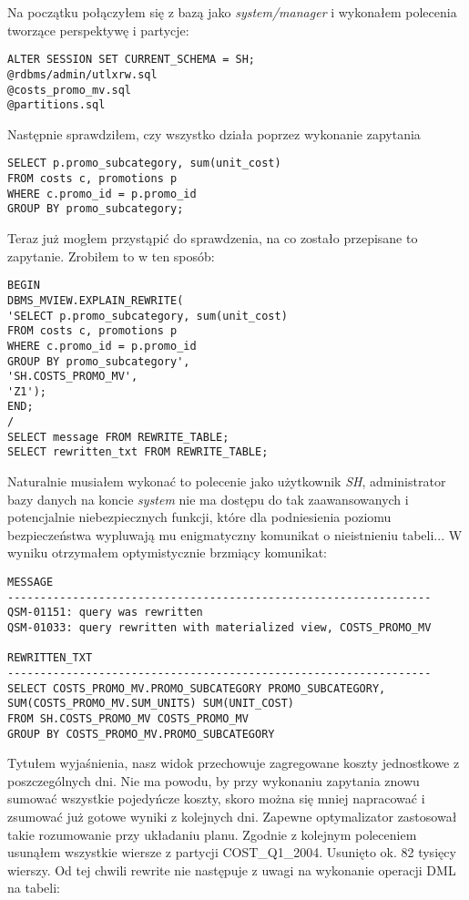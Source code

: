 \documentclass[a4paper,11pt]{article}
\begin{document}
Na początku połączyłem się z bazą jako \textit{system/manager} i wykonałem polecenia tworzące
perspektywę i partycje:
\begin{verbatim}
ALTER SESSION SET CURRENT_SCHEMA = SH;
@rdbms/admin/utlxrw.sql
@costs_promo_mv.sql
@partitions.sql
\end{verbatim}
Następnie sprawdziłem, czy wszystko działa poprzez wykonanie zapytania
\begin{verbatim}
SELECT p.promo_subcategory, sum(unit_cost)
FROM costs c, promotions p
WHERE c.promo_id = p.promo_id
GROUP BY promo_subcategory;
\end{verbatim}
Teraz już mogłem przystąpić do sprawdzenia, na co zostało przepisane to zapytanie. Zrobiłem to w ten sposób:
\begin{verbatim}
BEGIN
DBMS_MVIEW.EXPLAIN_REWRITE(
'SELECT p.promo_subcategory, sum(unit_cost)
FROM costs c, promotions p
WHERE c.promo_id = p.promo_id
GROUP BY promo_subcategory',
'SH.COSTS_PROMO_MV',
'Z1');
END;
/
SELECT message FROM REWRITE_TABLE;
SELECT rewritten_txt FROM REWRITE_TABLE;
\end{verbatim}
Naturalnie musiałem wykonać to polecenie jako użytkownik \textit{SH}, administrator bazy danych na koncie \textit{system} nie ma dostępu do tak zaawansowanych i potencjalnie niebezpiecznych funkcji, które dla podniesienia poziomu bezpieczeństwa wypluwają mu enigmatyczny komunikat o nieistnieniu tabeli... W wyniku otrzymałem optymistycznie brzmiący komunikat:
\begin{verbatim}
MESSAGE
-----------------------------------------------------------------
QSM-01151: query was rewritten
QSM-01033: query rewritten with materialized view, COSTS_PROMO_MV

REWRITTEN_TXT
-----------------------------------------------------------------
SELECT COSTS_PROMO_MV.PROMO_SUBCATEGORY PROMO_SUBCATEGORY,
SUM(COSTS_PROMO_MV.SUM_UNITS) SUM(UNIT_COST) 
FROM SH.COSTS_PROMO_MV COSTS_PROMO_MV
GROUP BY COSTS_PROMO_MV.PROMO_SUBCATEGORY
\end{verbatim}
Tytułem wyjaśnienia, nasz widok przechowuje zagregowane koszty jednostkowe z poszczególnych dni. Nie ma powodu, by przy wykonaniu zapytania znowu sumować wszystkie pojedyńcze koszty, skoro można się mniej napracować i zsumować już gotowe wyniki z kolejnych dni. Zapewne optymalizator zastosował takie rozumowanie przy układaniu planu.
Zgodnie z kolejnym poleceniem usunąłem wszystkie wiersze z partycji COST\_Q1\_2004. Usunięto ok. 82 tysięcy wierszy. Od tej chwili rewrite nie następuje z uwagi na wykonanie operacji DML na tabeli:
\end{document}
